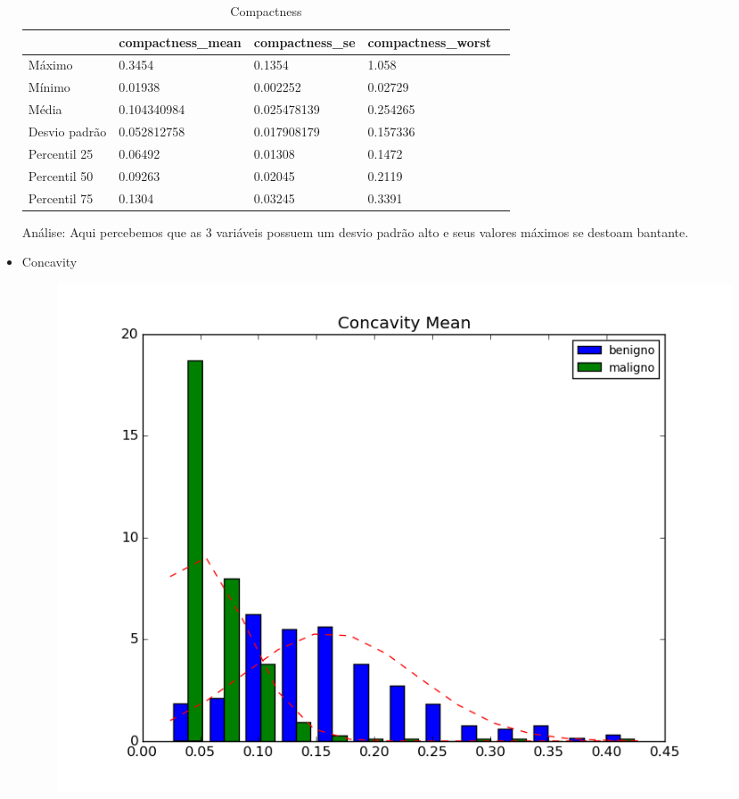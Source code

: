 \documentclass[11pt,a4paper]{article}
\numberwithin{equation}{section}
\begin{document}
\begin{itemize}
\begin{table}[H]
\centering
\caption{Compactness}
\label{my-label}
\begin{tabular}{lllll}\hline
              & compactness\_mean & compactness\_se & compactness\_worst &  \\ \hline
Máximo        & 0.3454            & 0.1354          & 1.058              &  \\
Mínimo        & 0.01938           & 0.002252        & 0.02729            &  \\
Média         & 0.104340984       & 0.025478139     & 0.254265           &  \\
Desvio padrão & 0.052812758       & 0.017908179     & 0.157336           &  \\
Percentil 25  & 0.06492           & 0.01308         & 0.1472             &  \\
Percentil 50  & 0.09263           & 0.02045         & 0.2119             &  \\
Percentil 75  & 0.1304            & 0.03245         & 0.3391             &  \\ \hline
\end{tabular}
\end{table}

Análise: Aqui percebemos que as 3 variáveis possuem um desvio padrão alto e seus valores máximos se destoam bantante.

\item Concavity
\begin{figure}[H]
\centering
  \includegraphics[width=.5\linewidth]{../img/hist/concavity_mean}
  \label{fig:test1}
\end{figure}%



\end{itemize}
\end{document}
